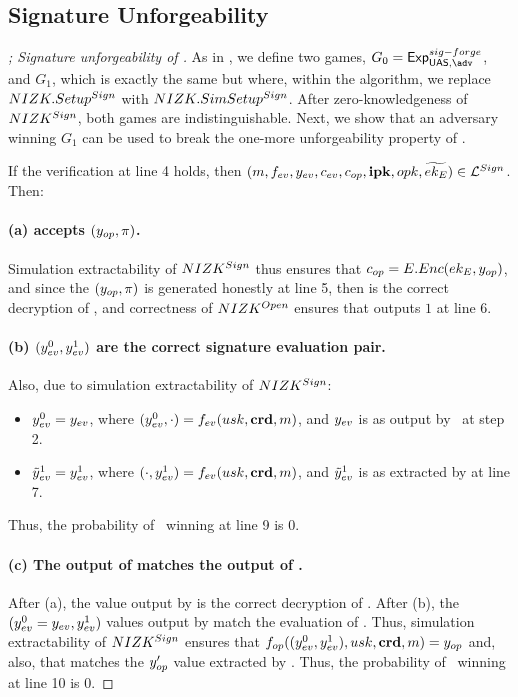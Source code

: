 \subsection{Signature Unforgeability}

\begin{proof}[; Signature unforgeability of \CUASGen]
  As in , we define two games, $G_0=\ExpForgeSign$,
  and $G_1$, which is exactly the same but where, within the \Setup algorithm,
  we replace $NIZK.Setup^{Sign}$ with $NIZK.SimSetup^{Sign}$. After
  zero-knowledgeness of $NIZK^{Sign}$, both games are indistinguishable.
  Next, we show that an adversary winning $G_1$ can be used to break the
  one-more unforgeability property of \SBCM.
 
  If the verification at line 4 holds, then $(m,f_{ev},y_{ev},c_{ev},
  c_{op},\mathbf{ipk},opk,\widetilde{ek_{E}}) \in \mathcal{L}^{Sign}$. Then:

  \paragraph{(a) \Judge accepts $(y_{op},\pi)$.} %
  Simulation extractability of $NIZK^{Sign}$ thus ensures that $c_{op} =
  E.Enc(ek_{E},y_{op})$, and since the $(y_{op},\pi)$ is generated honestly at
  line 5, then \yinsp is the correct decryption of \cinsp, and  correctness of
  $NIZK^{Open}$ ensures that \Judge outputs $1$ at line 6.

  \paragraph{(b) $(y_{ev}^0,y_{ev}^1)$ are the correct signature evaluation
    pair.} Also, due to simulation extractability of $NIZK^{Sign}$:

  \begin{itemize}
  \item $y_{ev}^0 = y_{ev}$, where $(y_{ev}^0,\cdot) = f_{ev}(usk,\mathbf{crd},
    m)$, and $y_{ev}$ is as output by \adv~at step 2.    
  \item $\tilde{y}_{ev}^1 = y_{ev}^1$, where $(\cdot,y_{ev}^1) = f_{ev}(usk,\mathbf{crd},
    m)$, and $\tilde{y}_{ev}^1$ is as extracted by \ExtractSign at line 7.
  \end{itemize}

  Thus, the probability of \adv~winning at line 9 is $0$.

  \paragraph{(c) The output of \finsp matches the output of \Open.} %
  After (a), the \yinsp value output by \Open is the correct decryption of
  \cinsp. After (b), the $(y_{ev}^0=y_{ev},y_{ev}^1)$ values output by
  \ExtractSign match the evaluation of \feval. Thus, simulation extractability
  of $NIZK^{Sign}$ ensures that $f_{op}((y_{ev}^0,y_{ev}^1),usk,\mathbf{crd},m)
  = y_{op}$ and, also, that \yinsp matches the $y_{op}'$ value extracted by
  \ExtractSign. Thus, the probability of \adv~winning at line 10 is $0$.


\end{proof}
